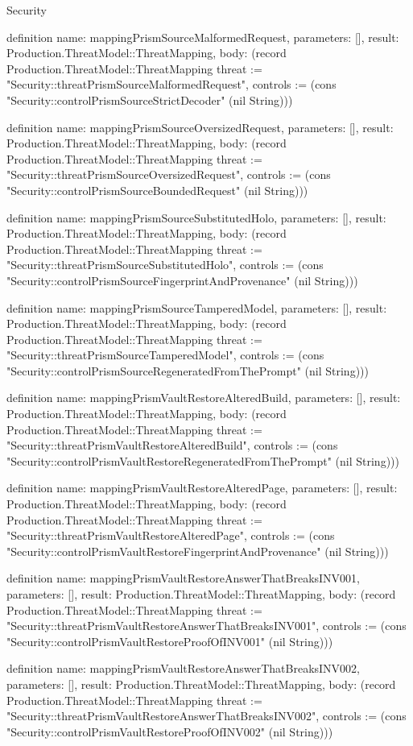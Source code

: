 \begin{lexlean}{Security}
\begin{semanticmodule}
definition{
  name: mappingPrismSourceMalformedRequest,
  parameters: [],
  result: Production.ThreatModel::ThreatMapping,
  body: (record Production.ThreatModel::ThreatMapping {threat := "Security::threatPrismSourceMalformedRequest", controls := (cons "Security::controlPrismSourceStrictDecoder" (nil String))})
}

definition{
  name: mappingPrismSourceOversizedRequest,
  parameters: [],
  result: Production.ThreatModel::ThreatMapping,
  body: (record Production.ThreatModel::ThreatMapping {threat := "Security::threatPrismSourceOversizedRequest", controls := (cons "Security::controlPrismSourceBoundedRequest" (nil String))})
}

definition{
  name: mappingPrismSourceSubstitutedHolo,
  parameters: [],
  result: Production.ThreatModel::ThreatMapping,
  body: (record Production.ThreatModel::ThreatMapping {threat := "Security::threatPrismSourceSubstitutedHolo", controls := (cons "Security::controlPrismSourceFingerprintAndProvenance" (nil String))})
}

definition{
  name: mappingPrismSourceTamperedModel,
  parameters: [],
  result: Production.ThreatModel::ThreatMapping,
  body: (record Production.ThreatModel::ThreatMapping {threat := "Security::threatPrismSourceTamperedModel", controls := (cons "Security::controlPrismSourceRegeneratedFromThePrompt" (nil String))})
}

definition{
  name: mappingPrismVaultRestoreAlteredBuild,
  parameters: [],
  result: Production.ThreatModel::ThreatMapping,
  body: (record Production.ThreatModel::ThreatMapping {threat := "Security::threatPrismVaultRestoreAlteredBuild", controls := (cons "Security::controlPrismVaultRestoreRegeneratedFromThePrompt" (nil String))})
}

definition{
  name: mappingPrismVaultRestoreAlteredPage,
  parameters: [],
  result: Production.ThreatModel::ThreatMapping,
  body: (record Production.ThreatModel::ThreatMapping {threat := "Security::threatPrismVaultRestoreAlteredPage", controls := (cons "Security::controlPrismVaultRestoreFingerprintAndProvenance" (nil String))})
}

definition{
  name: mappingPrismVaultRestoreAnswerThatBreaksINV001,
  parameters: [],
  result: Production.ThreatModel::ThreatMapping,
  body: (record Production.ThreatModel::ThreatMapping {threat := "Security::threatPrismVaultRestoreAnswerThatBreaksINV001", controls := (cons "Security::controlPrismVaultRestoreProofOfINV001" (nil String))})
}

definition{
  name: mappingPrismVaultRestoreAnswerThatBreaksINV002,
  parameters: [],
  result: Production.ThreatModel::ThreatMapping,
  body: (record Production.ThreatModel::ThreatMapping {threat := "Security::threatPrismVaultRestoreAnswerThatBreaksINV002", controls := (cons "Security::controlPrismVaultRestoreProofOfINV002" (nil String))})
}


\end{semanticmodule}
\end{lexlean}
